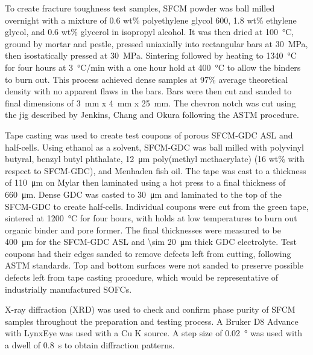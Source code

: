         To create fracture toughness test samples, SFCM powder was ball milled overnight with a mixture of 0.6 wt\% polyethylene glycol 600, 1.8 wt\% ethylene glycol, and 0.6 wt\% glycerol in isopropyl alcohol.
        It was then dried at \SI{100}{\celsius}, ground by mortar and pestle, pressed uniaxially into rectangular bars at \SI{30}{\mega\pascal}, then isostatically pressed at \SI{30}{\mega\pascal}.
        Sintering followed by heating to \SI{1340}{\celsius} for four hours at \SI{3}{\celsius/min}  with a one hour hold at \SI{400}{\celsius} to allow the binders to burn out.
        This process achieved dense samples at 97\% average theoretical density with no apparent flaws in the bars.
        Bars were then cut and sanded to final dimensions of \SI{3}{mm} x \SI{4}{mm} x \SI{25}{mm}.
        The chevron notch was cut using the jig described by Jenkins, Chang and Okura following the ASTM procedure.\cite{Jenkins1988, ASTM2016a}

        Tape casting was used to create test coupons of porous SFCM-GDC ASL and half-cells.
        Using ethanol as a solvent, SFCM-GDC was ball milled with polyvinyl butyral, benzyl butyl phthalate, \SI{12}{\micro\meter} poly(methyl methacrylate) (16 wt\% with respect to SFCM-GDC), and Menhaden fish oil.
        The tape was cast to a thickness of \SI{110}{\micro\meter} on Mylar then laminated using a hot press to a final thickness of \SI{660}{\micro\meter}.
        Dense GDC was casted to \SI{30}{\micro\meter} and laminated to the top of the SFCM-GDC to create half-cells.
        Individual coupons were cut from the green tape, sintered at \SI{1200}{\celsius} for four hours, with holds at low temperatures to burn out organic binder and pore former.
        The final thicknesses were measured to be \SI{400}{\micro\meter} for the SFCM-GDC ASL and \SI{\sim 20}{\micro\meter} thick GDC electrolyte.
        Test coupons had their edges sanded to remove defects left from cutting, following ASTM standards.\cite{ASTM2008}
        Top and bottom surfaces were not sanded to preserve possible defects left from tape casting procedure, which would be representative of industrially manufactured SOFCs.

        X-ray diffraction (XRD) was used to check and confirm phase purity of SFCM samples throughout the preparation and testing process.
        A Bruker D8 Advance with LynxEye was used with a Cu K\textsubscript{\textalpha{}} source.
        A step size of \SI{0.02}{\degree} was used with a dwell of \SI{0.8}{\second} to obtain diffraction patterns.

